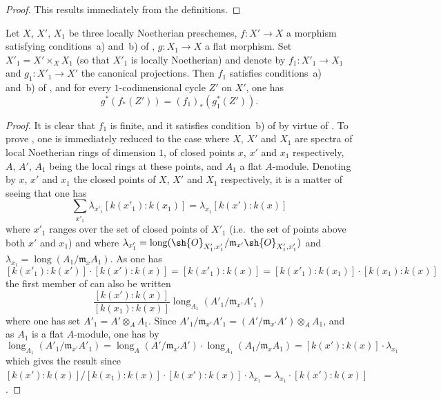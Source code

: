 \begin{proof}
This results immediately from the definitions.
\end{proof}

\begin{proposition}[21.10.16]
\label{IV.21.10.16}
Let $X$, $X'$, $X_1$ be three locally Noetherian preschemes, $f:X'\to X$ a morphism satisfying conditions~a) and~b) of , $g:X_1\to X$ a flat morphism.
Set $X'_1=X'\times_X X_1$ (so that $X'_1$ is locally Noetherian) and denote by $f_1:X'_1\to X_1$ and $g_1:X'_1\to X'$ the canonical projections.
Then $f_1$ satisfies conditions~a) and~b) of , and for every $1$-codimensional cycle $Z'$ on $X'$, one has
\[
\label{IV.21.10.16.1}
  g^*(f_*(Z'))=(f_1)_*(g_1^*(Z')).
  \tag{21.10.16.1}
\]
\end{proposition}

\begin{proof}
It is clear that $f_1$ is finite, and it satisfies condition~b) of  by virtue of .
To prove , one is immediately reduced to the case where $X$, $X'$ and $X_1$ are spectra of local Noetherian rings of dimension $1$, of closed points $x$, $x'$ and $x_1$ respectively, $A$, $A'$, $A_1$ being the local rings at these points, and $A_1$ a flat $A$-module.
Denoting by $x$, $x'$ and $x_1$ the closed points of $X$, $X'$ and $X_1$ respectively, it is a matter of seeing that one has
\[
\label{IV.21.10.16.2}
  \sum_{x'_1}\lambda_{x'_1}[k(x'_1):k(x_1)]=\lambda_{x_1}[k(x'):k(x)]
  \tag{21.10.16.2}
\]
where $x'_1$ ranges over the set of closed points of $X'_1$ (i.e.\ the set of points above both $x'$ and $x_1$) and where $\lambda_{x'_1}=\operatorname{long}(\sh{O}_{X'_1,x'_1}/\mathfrak{m}_{x'}\sh{O}_{X'_1,x'_1})$ and $\lambda_{x_1}=\operatorname{long}(A_1/\mathfrak{m}_x A_1)$.
As one has
\[
  [k(x'_1):k(x')]\cdot[k(x'):k(x)]=[k(x'_1):k(x)]=[k(x'_1):k(x_1)]\cdot[k(x_1):k(x)]
\]
the first member of  can also be written
\[
  \frac{[k(x'):k(x)]}{[k(x_1):k(x)]}\operatorname{long}_{A_1}(A'_1/\mathfrak{m}_{x'}A'_1)
\]
where one has set $A'_1=A'\otimes_A A_1$.
Since $A'_1/\mathfrak{m}_{x'}A'_1=(A'/\mathfrak{m}_{x'}A')\otimes_A A_1$, and as $A_1$ is a flat $A$-module, one has by 
\[
  \operatorname{long}_{A_1}(A'_1/\mathfrak{m}_{x'}A'_1)=\operatorname{long}_A(A'/\mathfrak{m}_{x'}A')\cdot\operatorname{long}_{A_1}(A_1/\mathfrak{m}_x A_1)=[k(x'):k(x)]\cdot\lambda_{x_1}
\]
which gives the result since $[k(x'):k(x)]/[k(x_1):k(x)]\cdot[k(x'):k(x)]\cdot\lambda_{x_1}=\lambda_{x_1}\cdot[k(x'):k(x)]$.
\end{proof}

